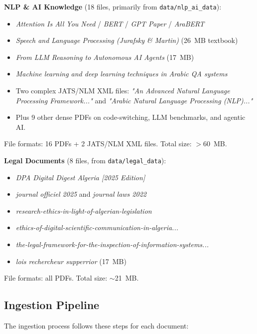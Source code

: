 \documentclass[12pt, a4paper]{article}
\begin{document}
\textbf{NLP \& AI Knowledge} (18 files, primarily from \texttt{data/nlp\_ai\_data}):
\begin{itemize}[leftmargin=2em]
  \item \textit{Attention Is All You Need} / \textit{BERT} / \textit{GPT Paper} / \textit{AraBERT}
  \item \textit{Speech and Language Processing (Jurafsky \& Martin)} (26~MB textbook)
  \item \textit{From LLM Reasoning to Autonomous AI Agents} (17~MB)
  \item \textit{Machine learning and deep learning techniques in Arabic QA systems}
  \item Two complex JATS/NLM XML files: \textit{"An Advanced Natural Language Processing Framework..."} and \textit{"Arabic Natural Language Processing (NLP)..."}
  \item Plus 9 other dense PDFs on code-switching, LLM benchmarks, and agentic AI.
\end{itemize}

File formats: 16 PDFs + 2 JATS/NLM XML files. Total size: $> 60$~MB.

\textbf{Legal Documents} (8 files, from \texttt{data/legal\_data}):
\begin{itemize}[leftmargin=2em]
  \item \textit{DPA Digital Digest Algeria [2025 Edition]}
  \item \textit{journal officiel 2025} and \textit{journal laws 2022}
  \item \textit{research-ethics-in-light-of-algerian-legislation}
  \item \textit{ethics-of-digital-scientific-communication-in-algeria...}
  \item \textit{the-legal-framework-for-the-inspection-of-information-systems...}
  \item \textit{lois rechercheur supperrior} (17~MB)
\end{itemize}

File formats: all PDFs. Total size: $\sim$21~MB.

\subsection{Ingestion Pipeline}

The ingestion process follows these steps for each document:
\end{document}
